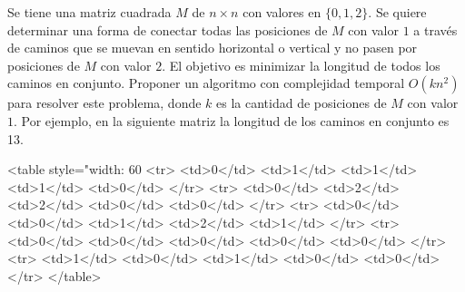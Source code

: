 

 \item Se tiene una matriz cuadrada $M$ de $n \times n$ con valores en $\{0,1,2\}$.  Se quiere determinar una forma de conectar todas las posiciones de $M$ con valor $1$ a través de caminos que se muevan en sentido horizontal o vertical y no pasen por posiciones de $M$ con valor $2$.  El objetivo es minimizar la longitud de todos los caminos en conjunto.  Proponer un algoritmo con complejidad temporal $O(kn^2)$ para resolver este problema, donde $k$ es la cantidad de posiciones de $M$ con valor $1$.  Por ejemplo, en la siguiente matriz la longitud de los caminos en conjunto es 13.





<table style="width: 60%
  <tr>
    <td>0</td>
    <td>1</td>
    <td>1</td>
    <td>1</td>
    <td>0</td>
  </tr>
  <tr>
    <td>0</td>
    <td>2</td>
    <td>2</td>
    <td>0</td>
    <td>0</td>
  </tr>
  <tr>
    <td>0</td>
    <td>0</td>
    <td>1</td>
    <td>2</td>
    <td>1</td>
  </tr>
  <tr>
    <td>0</td>
    <td>0</td>
    <td>0</td>
    <td>0</td>
    <td>0</td>
  </tr>
  <tr>
    <td>1</td>
    <td>0</td>
    <td>1</td>
    <td>0</td>
    <td>0</td>
  </tr>
</table>

